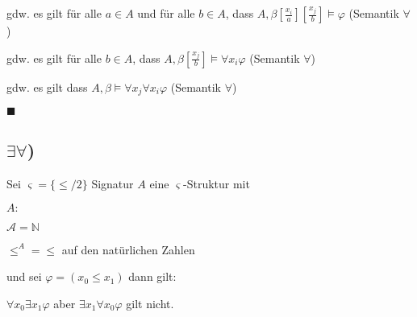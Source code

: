 gdw. es gilt für alle $a\in A$ und für alle $b \in A$, dass $A,\beta[\frac{x_i}{a}][\frac{x_j}{b}] \vDash \varphi$ (Semantik $\forall$)

\hfill

gdw. es gilt für alle $b \in A$, dass $A,\beta[\frac{x_j}{b}] \vDash \forall x_i \varphi$ (Semantik $\forall$)

\hfill

gdw. es gilt dass $A,\beta \vDash \forall x_j \forall x_i \varphi$ (Semantik $\forall$)

\hfill

$\blacksquare$

\subsection*{$\exists \forall$)}
Sei $\varsigma=\{\leq/2\}$ Signatur $A$ eine $\varsigma$-Struktur mit

$A:$

$\mathcal{A}=\mathbb{N}$

$\leq^A =  \leq$ auf den natürlichen Zahlen

\hfill

und sei $\varphi = (x_0 \leq x_1)$ dann gilt:
 
$\forall x_0 \exists x_1 \varphi$ aber $\exists x_1 \forall x_0 \varphi$ gilt nicht. 
 

